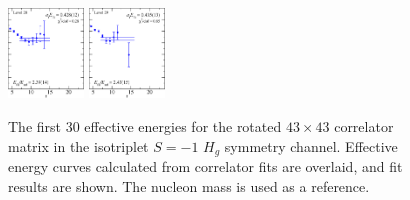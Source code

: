 \begin{figure}[H]
    \includegraphics[width=0.18\textwidth]{figures/sigmas/hg/fits/fit_27.pdf}
    \includegraphics[width=0.18\textwidth]{figures/sigmas/hg/fits/fit_29.pdf}
    \caption[The first 30 effective energies for the rotated $43\times 43$ correlator matrix in the isotriplet $S=-1$ $H_g$ symmetry channel.]{The first 30 effective energies for the rotated $43\times 43$ correlator matrix in the isotriplet $S=-1$ $H_g$ symmetry channel. Effective energy curves calculated from correlator fits are overlaid, and fit results are shown. The nucleon mass is used as a reference.}\label{fig:hg_fits1}
\end{figure}

